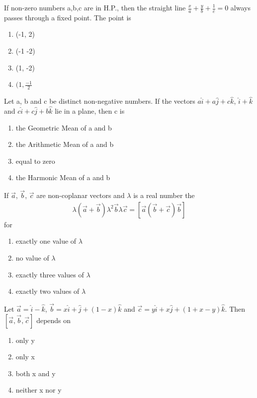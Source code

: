 \item If non-zero numbers a,b,c are in H.P., then the straight line $\frac{x}{a}+\frac{y}{b}+\frac{1}{c}=0$ always passes through a fixed point. The point is
\begin{enumerate}
\item (-1, 2)
\item (-1 -2)
\item (1, -2)
\item $(1, \frac{-1}{2}$
\end{enumerate}

\item Let a, b and c be distinct non-negative numbers. If the vectors $a\hat{i}+a\hat{j}+c\hat{k}$, $\hat{i}+\hat{k}$ and $c\hat{i}+c\hat{j}+b\hat{k}$ lie in a plane, then c is
\begin{enumerate}
\item the Geometric Mean of a and b
\item the Arithmetic Mean of a and b
\item equal to zero
\item the Harmonic Mean of a and b
\end{enumerate}

\item If $\overrightarrow{a}$, $\overrightarrow{b}$, $\overrightarrow{c}$ are non-coplanar vectors and $\lambda$ is a real number the 
\begin{align*}
\lambda(\overrightarrow{a}+\overrightarrow{b})\lambda^{2}\overrightarrow{b}\lambda\overrightarrow{c}=[\overrightarrow{a}  (\overrightarrow{b}+\overrightarrow{c}) \overrightarrow{b}]
\end{align*}
for
\begin{enumerate}
\item exactly one value of $\lambda$
\item no value of $\lambda$
\item exactly three values of $\lambda$
\item exactly two values of $\lambda$
\end{enumerate}

\item Let $\overrightarrow{a}=\hat{i}-\hat{k}$, $\overrightarrow{b}=x\hat{i}+\hat{j}+(1-x)\hat{k}$ and $\overrightarrow{c}=y\hat{i}+x\hat{j}+(1+x-y)\hat{k}$. Then $[\overrightarrow{a},\overrightarrow{b},\overrightarrow{c}]$ depends on
\begin{enumerate}
\item only y
\item only x
\item both x and y
\item neither x nor y
\end{enumerate}

